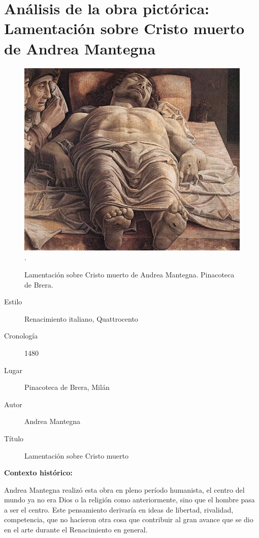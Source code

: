 \section{Análisis de la obra pictórica: Lamentación sobre Cristo muerto de Andrea Mantegna}

\begin{figure}[ht!]
	\includegraphics[width=\textwidth]{mantegna.jpg}
   .\caption{Lamentación sobre Cristo muerto de Andrea Mantegna. Pinacoteca de Brera.} %
\end{figure}

\newpage

\begin{description}
\item[Estilo] Renacimiento italiano, Quattrocento
\item[Cronología] 1480
\item[Lugar] Pinacoteca de Brera, Milán
\item[Autor] Andrea Mantegna
\item[Título] Lamentación sobre Cristo muerto
\end{description}

\textbf{Contexto histórico:}

Andrea Mantegna realizó esta obra en pleno período humanista, el centro del mundo ya no era Dios o la religión como anteriormente, sino que el hombre pasa a ser el centro. Este pensamiento derivaría en ideas de libertad, rivalidad, competencia, que no hacieron otra cosa que contribuir al gran avance que se dio en el arte durante el Renacimiento en general.

